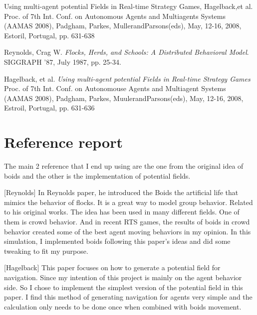 \documentclass[letterpaper, 12pt]{article}
\begin{document}
Using multi-agent potential Fields in Real-time Strategy Games, Hagelback,et al. Proc. of 7th Int.
Conf. on Autonomous Agents and Multiagents Systems (AAMAS 2008), Padgham, Parkes, MullerandParsons(eds),
May, 12-16, 2008, Estoril, Portugal, pp. 631-638


\begin{thebibliography}{9}
     Reynolds, Crag W. \emph{Flocks, Herds, and Schools: A Distributed Behavioral Model}. SIGGRAPH '87, July 1987, pp. 25-34.


     Hagelback, et al. \emph{Using multi-agent potential Fields in Real-time Strategy Games} Proc. of 7th Int. Conf. on Autonomouse Agents and Multiagent Systems (AAMAS 2008), Padgham, Parkes, MuulerandParsons(eds), May, 12-16, 2008, Estroil, Portugal, pp. 631-636
\end{thebibliography}


\section*{Reference report}
The main 2 reference that I end up using are the one from the original idea of boids and the other is the implementation of potential fields. 

[Reynolds] In Reynolds paper, he introduced the Boids the artificial life that mimics the behavior of flocks. It is a great way to model group behavior. Related to his original works. The idea has been used in many different fields. One of them is crowd behavior. And in recent RTS games, the results of boids in crowd behavior created some of the best agent moving behaviors in my opinion. In this simulation, I implemented boids following this paper's ideas and did some tweaking to fit my purpose.

[Hagelback] This paper focuses on how to generate a potential field for navigation. Since my intention of this project is mainly on the agent behavior side. So I chose to implement the simplest version of the potential field in this paper. I find this method of generating navigation for agents very simple and the calculation only needs to be done once when combined with boids movement. 
\end{document}
